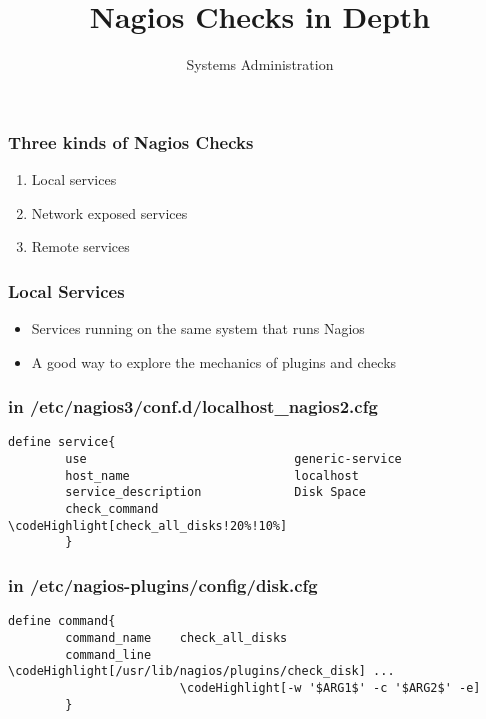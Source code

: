 \documentclass[10pt]{beamer}
\title{Nagios Checks in Depth}
\author[IN719]{Systems Administration}
\institute[Otago Polytechnic]{
  School of Information Technology \\
  Otago Polytechnic \\
  Dunedin, New Zealand \\
}
\date{}
\newcommand\codeHighlight[1]{\textcolor[rgb]{1,0,0}{\textbf{#1}}}
\begin{document}
\begin{frame}[plain]
  \titlepage
\end{frame}

\begin{frame}
  \frametitle{Three kinds of Nagios Checks}


\begin{enumerate}
  \item Local services
  \item Network exposed services
  \item Remote services
\end{enumerate}

\end{frame}

\begin{frame}
  \frametitle{Local Services}


\begin{itemize}
  \item Services running on the same system that runs Nagios
  \item A good way to explore the mechanics of plugins and checks
\end{itemize}

\end{frame}

\begin{frame}[fragile]
  \frametitle{in /etc/nagios3/conf.d/localhost\_nagios2.cfg}


\begin{Verbatim}[commandchars=\\\[\]]
define service{
        use                             generic-service
        host_name                       localhost
        service_description             Disk Space
        check_command                   \codeHighlight[check_all_disks!20%!10%]
        }
\end{Verbatim}


\end{frame}

\begin{frame}[fragile]
  \frametitle{in /etc/nagios-plugins/config/disk.cfg}

\begin{Verbatim}[commandchars=\\\[\]]
define command{
        command_name    check_all_disks
        command_line    \codeHighlight[/usr/lib/nagios/plugins/check_disk] ...
                        \codeHighlight[-w '$ARG1$' -c '$ARG2$' -e]
        }

\end{Verbatim}
\end{frame}
\end{document}
